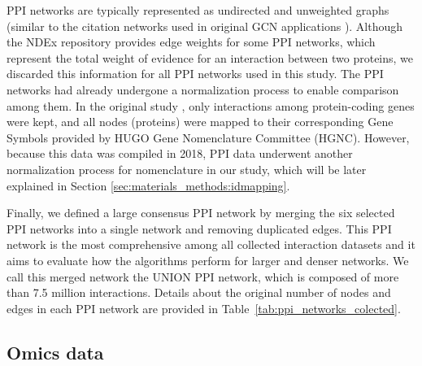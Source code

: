 PPI networks are typically represented as undirected and unweighted graphs (similar to the citation networks used in original GCN applications \cite{kipf2016semi}). Although the NDEx repository provides edge weights for some PPI networks, which represent the total weight of evidence for an interaction between two proteins, we discarded this information for all PPI networks used in this study. The PPI networks had already undergone a normalization process to enable comparison among them. In the original study \cite{huang2018systematic}, only interactions among protein-coding genes were kept, and all nodes (proteins) were mapped to their corresponding Gene Symbols provided by HUGO Gene Nomenclature Committee (HGNC). However, because this data was compiled in 2018, PPI data underwent another normalization process for nomenclature in our study, which will be later explained in Section \ref{sec:materials_methods:idmapping}. 


Finally, we defined a large consensus PPI network by merging the six selected PPI networks into a single network and removing duplicated edges. This PPI network is the most comprehensive among all collected interaction datasets and it aims to evaluate how the algorithms perform for larger and denser networks.
We call this merged network the UNION PPI network, which is composed of more than 7.5 million interactions. Details about the original number of nodes and edges in each PPI network are provided in Table~\ref{tab:ppi_networks_colected}.

\begin{table}[!h]
\centering
\caption{Number of nodes and edges in PPI networks \label{tab:ppi_networks_colected}}
\end{table}



\subsection{Omics data}
\label{sec:materials_methods:omics}

